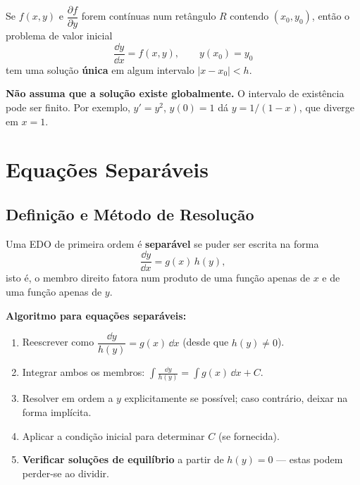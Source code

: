 \begin{thmbox}[title={Existência e Unicidade (Picard--Lindel\"{o}f)}]
  Se $f(x,y)$ e $\dfrac{\partial f}{\partial y}$ forem contínuas num retângulo $R$
  contendo $(x_0, y_0)$, então o problema de valor inicial
  \[
    \frac{\dd y}{\dd x} = f(x,y), \qquad y(x_0)=y_0
  \]
  tem uma solução \textbf{única} em algum intervalo $|x - x_0| < h$.
\end{thmbox}

\begin{warnbox}
  \textbf{Não assuma que a solução existe globalmente.} O intervalo de existência pode ser
  finito. Por exemplo, $y' = y^2$, $y(0)=1$ dá $y = 1/(1-x)$, que diverge em $x=1$.
\end{warnbox}

\section{Equações Separáveis}
\label{sec:separable5}

\subsection{Definição e Método de Resolução}

\begin{defbox}[title={EDO Separável}]
  Uma EDO de primeira ordem é \textbf{separável} se puder ser escrita na forma
  \[
    \frac{\dd y}{\dd x} = g(x)\,h(y),
  \]
  isto é, o membro direito fatora num produto de uma função apenas de $x$ e de uma
  função apenas de $y$.
\end{defbox}

\noindent\textbf{Algoritmo para equações separáveis:}

\begin{enumerate}
  \item Reescrever como $\dfrac{\dd y}{h(y)} = g(x)\,\dd x$ \quad (desde que $h(y)\neq 0$).
  \item Integrar ambos os membros:
        $\displaystyle\int \frac{\dd y}{h(y)} = \int g(x)\,\dd x + C$.
  \item Resolver em ordem a $y$ explicitamente se possível; caso contrário, deixar na forma implícita.
  \item Aplicar a condição inicial para determinar $C$ (se fornecida).
  \item \textbf{Verificar soluções de equilíbrio} a partir de $h(y)=0$ --- estas podem
        perder-se ao dividir.
\end{enumerate}

